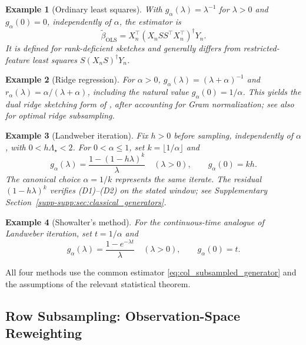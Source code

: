 \documentclass[pdflatex,iicol,sn-mathphys-ay]{sn-jnl}
\theoremstyle{thmstyleone}
\theoremstyle{thmstylethree}
\theoremstyle{thmstyletwo}
\newtheorem{example}{Example}
\begin{document}
\begin{example}[Ordinary least squares]\label{ex:subsampled_ols}
With $g_\alpha(\lambda)=\lambda^{-1}$ for $\lambda>0$ and $g_\alpha(0)=0$,
independently of $\alpha$, the estimator is
\begin{equation}
 \widetilde\beta_{\mathrm{OLS}}
 =X_n^\top(X_nSS^\top X_n^\top)^\dagger Y_n.
 \label{eq:subsampled_ols}
\end{equation}
It is defined for rank-deficient sketches and generally differs from
restricted-feature least squares $S(X_nS)^\dagger Y_n$.
\end{example}

\begin{example}[Ridge regression]\label{ex:subsampled_ridge}
For $\alpha>0$, $g_\alpha(\lambda)=(\lambda+\alpha)^{-1}$ and
$r_\alpha(\lambda)=\alpha/(\lambda+\alpha)$, including the natural value
$g_\alpha(0)=1/\alpha$. This yields the dual ridge sketching form
of \citet{liu2020ridge}, after accounting for Gram normalization;
see also \citet{li2024optimal} for optimal ridge subsampling.
\end{example}

\begin{example}[Landweber iteration]\label{ex:subsampled_landweber}
Fix $h>0$ before sampling, independently of $\alpha$, with
$0<h\Lambda_\star<2$. For $0<\alpha\le1$, set
$k=\lfloor1/\alpha\rfloor$ and
\[
 g_\alpha(\lambda)=\frac{1-(1-h\lambda)^k}{\lambda}\quad(\lambda>0),
 \qquad g_\alpha(0)=kh.
\]
The canonical choice $\alpha=1/k$ represents the same iterate.
The residual $(1-h\lambda)^k$ verifies (D1)--(D2) on the stated window;
see Supplementary Section~\ref{supp-supp:sec:classical_generators}.
\end{example}

\begin{example}[Showalter's method]\label{ex:subsampled_showalter}
For the continuous-time analogue of Landweber iteration, set
$t=1/\alpha$ and
\[
 g_\alpha(\lambda)=\frac{1-e^{-\lambda t}}{\lambda}\quad(\lambda>0),
 \qquad g_\alpha(0)=t.
\]
\end{example}
All four methods use the common estimator \eqref{eq:col_subsampled_generator}
and the assumptions of the relevant statistical theorem.

\subsection{Row Subsampling: Observation-Space Reweighting}
\label{subsec:row_subsampling_framework}
\end{document}
